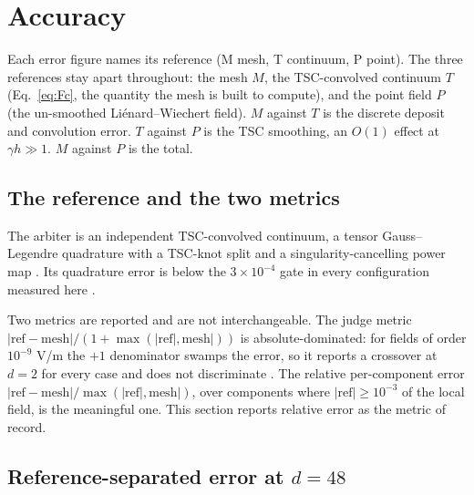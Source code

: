 \section{Accuracy}
\label{sec:accuracy}

Each error figure names its reference (M mesh, T continuum, P point). The three
references stay apart throughout:
the mesh $M$, the TSC-convolved continuum $T$ (Eq.~\eqref{eq:Fc}, the
quantity the mesh is built to compute), and the point field $P$ (the
un-smoothed Li\'enard--Wiechert field). $M$ against $T$ is the discrete
deposit and convolution error. $T$ against $P$ is the TSC smoothing, an
$O(1)$ effect at $\gamma h \gg 1$. $M$ against $P$ is the total.

\subsection{The reference and the two metrics}

The arbiter is an independent TSC-convolved continuum, a tensor
Gauss--Legendre quadrature with a TSC-knot split and a singularity-cancelling
power map \citep{indfield}. Its quadrature error is below the
$3\times10^{-4}$ gate in every configuration measured here \citep{N2b}.

Two metrics are reported and are not interchangeable. The judge metric
$|\mathrm{ref}-\mathrm{mesh}|/(1+\max(|\mathrm{ref}|,\mathrm{mesh}|))$ is
absolute-dominated: for fields of order $10^{-9}$ V/m the $+1$ denominator
swamps the error, so it reports a crossover at $d=2$ for every case and does
not discriminate \citep{W4b}. The relative per-component error
$|\mathrm{ref}-\mathrm{mesh}|/\max(|\mathrm{ref}|,\mathrm{mesh}|)$, over
components where $|\mathrm{ref}|\ge10^{-3}$ of the local field, is the
meaningful one. This section reports relative error as the metric of record.

\subsection{Reference-separated error at $d=48$}

